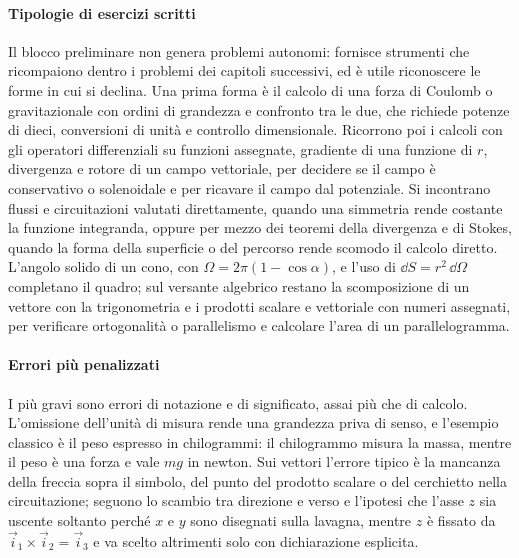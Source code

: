 \documentclass[main.tex]{subfiles}
\begin{document}
\medskip

\paragraph*{Tipologie di esercizi scritti}
Il blocco preliminare non genera problemi autonomi: fornisce strumenti che ricompaiono dentro i problemi dei capitoli successivi, ed è utile riconoscere le forme in cui si declina. Una prima forma è il calcolo di una forza di Coulomb o gravitazionale con ordini di grandezza e confronto tra le due, che richiede potenze di dieci, conversioni di unità e controllo dimensionale. Ricorrono poi i calcoli con gli operatori differenziali su funzioni assegnate, gradiente di una funzione di $r$, divergenza e rotore di un campo vettoriale, per decidere se il campo è conservativo o solenoidale e per ricavare il campo dal potenziale. Si incontrano flussi e circuitazioni valutati direttamente, quando una simmetria rende costante la funzione integranda, oppure per mezzo dei teoremi della divergenza e di Stokes, quando la forma della superficie o del percorso rende scomodo il calcolo diretto. L'angolo solido di un cono, con $\Omega=2\pi(1-\cos\alpha)$, e l'uso di $\dd S=r^2\,\dd\Omega$ completano il quadro; sul versante algebrico restano la scomposizione di un vettore con la trigonometria e i prodotti scalare e vettoriale con numeri assegnati, per verificare ortogonalità o parallelismo e calcolare l'area di un parallelogramma.

\medskip

\paragraph*{Errori più penalizzati}
I più gravi sono errori di notazione e di significato, assai più che di calcolo. L'omissione dell'unità di misura rende una grandezza priva di senso, e l'esempio classico è il peso espresso in chilogrammi: il chilogrammo misura la massa, mentre il peso è una forza e vale $mg$ in newton. Sui vettori l'errore tipico è la mancanza della freccia sopra il simbolo, del punto del prodotto scalare o del cerchietto nella circuitazione; seguono lo scambio tra direzione e verso e l'ipotesi che l'asse $z$ sia uscente soltanto perché $x$ e $y$ sono disegnati sulla lavagna, mentre $z$ è fissato da $\vec i_1\times\vec i_2=\vec i_3$ e va scelto altrimenti solo con dichiarazione esplicita.
\end{document}
